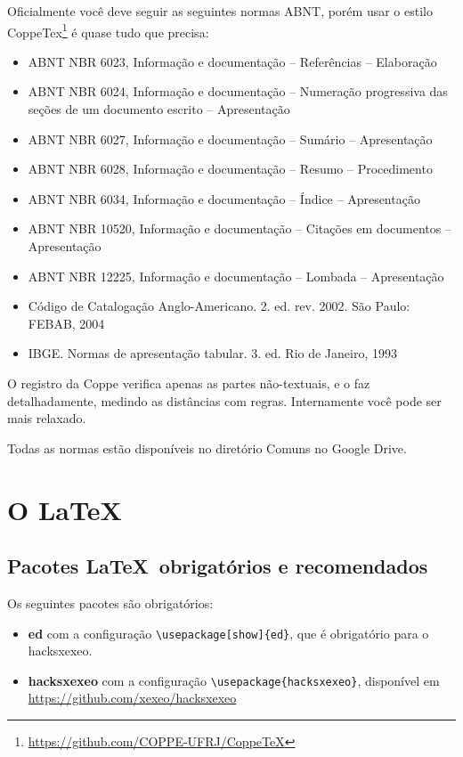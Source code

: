 \documentclass{article}
\begin{document}
\begin{itemize}
Oficialmente você deve seguir as seguintes normas ABNT, porém usar o estilo CoppeTex\footnote{\url{https://github.com/COPPE-UFRJ/CoppeTeX}} é quase tudo que precisa:
\begin{itemize}
    \item ABNT NBR 6023, Informação e documentação – Referências – Elaboração
\item ABNT NBR 6024, Informação e documentação – Numeração progressiva das seções de um documento
escrito – Apresentação
\item ABNT NBR 6027, Informação e documentação – Sumário – Apresentação
\item ABNT NBR 6028, Informação e documentação – Resumo – Procedimento
\item ABNT NBR 6034, Informação e documentação – Índice – Apresentação
\item ABNT NBR 10520, Informação e documentação – Citações em documentos – Apresentação
\item ABNT NBR 12225, Informação e documentação – Lombada – Apresentação
\item Código de Catalogação Anglo-Americano. 2. ed. rev. 2002. São Paulo: FEBAB, 2004
\item IBGE. Normas de apresentação tabular. 3. ed. Rio de Janeiro, 1993
\end{itemize}

O registro da Coppe verifica apenas as partes não-textuais, e o faz detalhadamente, medindo as distâncias com regras. Internamente você pode ser mais relaxado. 

Todas as normas estão disponíveis no diretório Comuns no Google Drive.
    
\end{itemize}





\section{O \LaTeX}

\subsection{Pacotes \LaTeX\  obrigatórios e recomendados}

Os seguintes pacotes são obrigatórios:

\begin{itemize}
    \item \textbf{ed} com a configuração \verb!\usepackage[show]{ed}!, que é obrigatório para o hacksxexeo.
        \item \textbf{hacksxexeo} com a configuração \verb!\usepackage{hacksxexeo}!, disponível em \url{https://github.com/xexeo/hacksxexeo}
\end{itemize}
    
\end{document}
